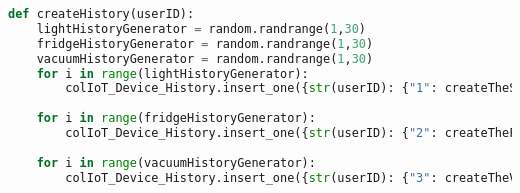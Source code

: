 \begin{lstlisting}[language=Python, caption=Showcase of createHistory]
def createHistory(userID):
    lightHistoryGenerator = random.randrange(1,30)
    fridgeHistoryGenerator = random.randrange(1,30)
    vacuumHistoryGenerator = random.randrange(1,30)
    for i in range(lightHistoryGenerator):
        colIoT_Device_History.insert_one({str(userID): {"1": createTheSmartLight()["Device_Status"]}})
    
    for i in range(fridgeHistoryGenerator):
        colIoT_Device_History.insert_one({str(userID): {"2": createTheFridge()["Device_Status"]}})
        
    for i in range(vacuumHistoryGenerator):
        colIoT_Device_History.insert_one({str(userID): {"3": createTheVauum()["Device_Status"]}})
\end{lstlisting}